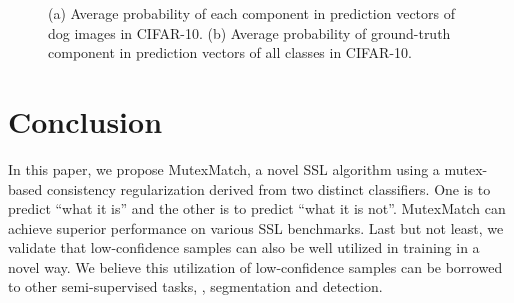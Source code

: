 \documentclass[lettersize,journal]{IEEEtran}
\theoremstyle{plain}
\theoremstyle{definition}
\theoremstyle{remark}
\begin{document}
\begin{figure}[t]
\centering
  \hfil
\caption{(a) Average probability of each component in prediction vectors of dog images in CIFAR-10. (b) Average probability of ground-truth component in prediction vectors of all classes in CIFAR-10.}
\vskip 0in
\end{figure}

\section{Conclusion}
\label{sec:con}
In this paper, we propose MutexMatch, a novel SSL algorithm using a mutex-based consistency regularization derived from two distinct classifiers. One is to predict ``what it is'' and the other is to predict ``what it is not''. 
MutexMatch can achieve superior performance on various SSL benchmarks.
Last but not least, we validate that low-confidence samples can also be well utilized in training in a novel way.
We believe this utilization of low-confidence samples can be borrowed to other semi-supervised tasks,
\eg, segmentation and detection.




















































\vfill
\end{document}
